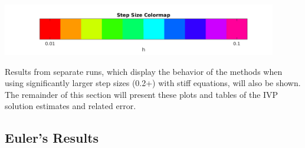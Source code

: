 \documentclass{article}
\begin{document}
\begin{center}
  \includegraphics[width=0.9\textwidth]{../output/colormap.png}
  \label{fig:h_val_colormap}
\end{center}

Results from separate runs, which display the behavior of the methods when using significantly larger step sizes (0.2+) with stiff equations, will also be shown. The remainder of this section will present these plots and tables of the IVP solution estimates and related error. 


\subsection{Euler's Results}
\label{results:euler}
\end{document}
